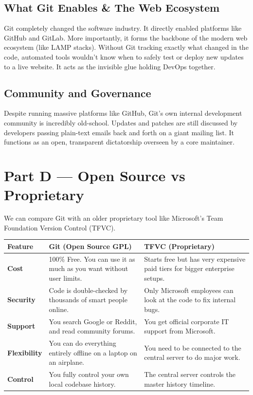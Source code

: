\documentclass[12pt,a4paper]{report}
\begin{document}
\subsection{What Git Enables \& The Web Ecosystem}
Git completely changed the software industry. It directly enabled platforms like GitHub and GitLab. More importantly, it forms the backbone of the modern web ecosystem (like LAMP stacks). Without Git tracking exactly what changed in the code, automated tools wouldn't know when to safely test or deploy new updates to a live website. It acts as the invisible glue holding DevOps together.

\subsection{Community and Governance}
Despite running massive platforms like GitHub, Git's own internal development community is incredibly old-school. Updates and patches are still discussed by developers passing plain-text emails back and forth on a giant mailing list. It functions as an open, transparent dictatorship overseen by a core maintainer.

\section{Part D --- Open Source vs Proprietary}

We can compare Git with an older proprietary tool like Microsoft's Team Foundation Version Control (TFVC).

\begin{center}
\begin{longtable}{|p{3cm}|p{6cm}|p{6cm}|}
\hline
\textbf{Feature} & \textbf{Git (Open Source GPL)} & \textbf{TFVC (Proprietary)} \\
\hline
\textbf{Cost} & 100\% Free. You can use it as much as you want without user limits. & Starts free but has very expensive paid tiers for bigger enterprise setups. \\
\hline
\textbf{Security} & Code is double-checked by thousands of smart people online. & Only Microsoft employees can look at the code to fix internal bugs. \\
\hline
\textbf{Support} & You search Google or Reddit, and read community forums. & You get official corporate IT support from Microsoft. \\
\hline
\textbf{Flexibility} & You can do everything entirely offline on a laptop on an airplane. & You need to be connected to the central server to do major work. \\
\hline
\textbf{Control} & You fully control your own local codebase history. & The central server controls the master history timeline. \\
\hline
\end{longtable}
\end{center}
\end{document}

